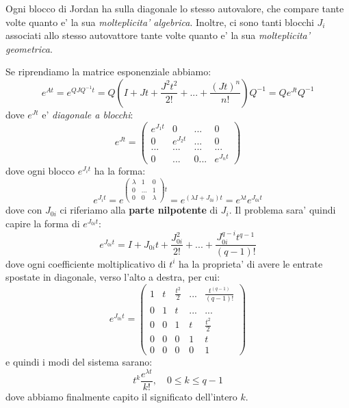 \documentclass[a4paper,11pt]{article}
\begin{document}
Ogni blocco di Jordan ha sulla diagonale lo stesso autovalore, che compare tante volte quanto e' la sua \textit{molteplicita' algebrica}.
Inoltre, ci sono tanti blocchi $J_i$ associati allo stesso autovattore tante volte quanto e' la sua \textit{molteplicita' geometrica}.

\par\smallskip

Se riprendiamo la matrice esponenziale abbiamo:
$$
e^{At} = e^{QJQ^{-1}t} = Q \left( I + Jt + \frac{J^2 t^2}{2!} + ... + \frac{(Jt)^n}{n!} \right) Q^{-1} = Q e^{Jt} Q^{-1}
$$
dove $e^{Jt}$ e' \textit{diagonale a blocchi}:
$$
e^{Jt} = \begin{pmatrix}
e^{J_1 t} & 0 & ... & 0 \\
0 & e^{J_2 t} & ... & 0 \\
... & ... & ... & ... \\ 
0 & ... & 0 ... & e^{J_n t}
\end{pmatrix}
$$
dove ogni blocco $e^{J_i t}$ ha la forma:
$$
e^{J_i t} = e^{ \begin{pmatrix}
		\lambda & 1 & 0 \\
		0 & ... & 1 \\ 
		0 & 0 & \lambda
\end{pmatrix} t}
= e^{(\lambda I + J_{0i})t} = e^{\lambda t} e^{J_{0i} t}
$$
dove con $J_{0i}$ ci riferiamo alla \textbf{parte nilpotente} di $J_i$.
Il problema sara' quindi capire la forma di $e^{J_{0i} t}$:
$$
e^{J_{0i} t} = I + J_{0i}t + \frac{J_{0i}^2}{2!} + ... + \frac{J_{0i}^{q - i} t^{q - 1}}{(q - 1)!}
$$
dove ogni coefficiente moltiplicativo di $t^i$ ha la proprieta' di avere le entrate spostate in diagonale, verso l'alto a destra, per cui:
$$
e^{J_{0i} t} = \begin{pmatrix}
	1 & t & \frac{t^2}{2} & ... & \frac{t^{(q - 1)}}{(q - 1)!} \\
	0 & 1 & t & ... & ... \\
	0 & 0 & 1 & t & \frac{t^2}{2} \\ 
	0 & 0 & 0 & 1 & t \\
	0 & 0 & 0 & 0 & 1
\end{pmatrix}
$$
e quindi i modi del sistema sarano:
$$
t^k \frac{e^{\lambda t}}{k!}, \quad 0 \leq k \leq q - 1
$$
dove abbiamo finalmente capito il significato dell'intero $k$.
\end{document}
